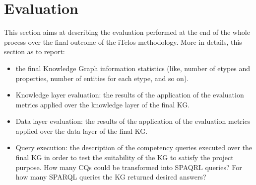 \section{Evaluation}

This section aims at describing the evaluation performed at the end of the whole process over the final outcome of the iTelos methodology. More in details, this section as to report:

\begin{itemize}
    \item the final Knowledge Graph information statistics (like, number of etypes and properties, number of entities for each etype, and so on).
    \item Knowledge layer evaluation: the results of the application of the evaluation metrics applied over the knowledge layer of the final KG.
    \item Data layer evaluation: the results of the application of the evaluation metrics applied over the data layer of the final KG.
    \item Query execution: the description of the competency queries executed over the final KG in order to test the suitability of the KG to satisfy the project purpose. How many CQs could be transformed into SPAQRL queries? For how many SPARQL queries the KG returned desired answers?
\end{itemize}

